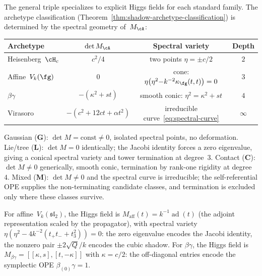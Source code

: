The general triple specializes to explicit Higgs fields for
each standard family. The archetype classification
(Theorem~\ref{thm:shadow-archetype-classification}) is
determined by the spectral geometry of~$M_\cA$:
\begin{center}
\small
\renewcommand{\arraystretch}{1.2}
\begin{tabular}{lccc}
\toprule
\textbf{Archetype}
 & $\det M_\cA$
 & \textbf{Spectral variety}
 & \textbf{Depth} \\
\midrule
Heisenberg~$\cH_c$
 & $c^2/4$
 & two points $\eta = \pm c/2$
 & $2$ \\[3pt]
Affine~$V_k(\fg)$
 & $0$
 & cone: $\eta\bigl(\eta^2 {-} k^{-2}
 \kappa_\fg(t,t)\bigr) = 0$
 & $3$ \\[3pt]
$\beta\gamma$
 & $-(\kappa^2 {+} st)$
 & smooth conic: $\eta^2 = \kappa^2 {+} st$
 & $4$ \\[3pt]
Virasoro
 & $-(c^2 {+} 12ct {+} \alpha t^2)$
 & irreducible curve~\eqref{eq:spectral-curve}
 & $\infty$ \\
\bottomrule
\end{tabular}
\end{center}
\noindent
Gaussian ($\mathbf{G}$): $\det M = \mathrm{const} \neq 0$,
isolated spectral points, no deformation.
Lie/tree ($\mathbf{L}$): $\det M = 0$ identically; the Jacobi
identity forces a zero eigenvalue, giving a conical spectral
variety and tower termination at degree~$3$.
Contact ($\mathbf{C}$): $\det M \neq 0$ generically, smooth
conic, termination by rank-one rigidity at degree~$4$.
Mixed ($\mathbf{M}$): $\det M \neq 0$ and the spectral curve is
irreducible; the self-referential OPE supplies the non-terminating
candidate classes, and termination is excluded only where these classes
survive.

For affine~$V_k(\mathfrak{sl}_2)$, the Higgs field is
$M_{\mathrm{aff}}(t) = k^{-1}\operatorname{ad}(t)$
(the adjoint representation scaled by the propagator), with
spectral variety
$\eta(\eta^2 - 4k^{-2}(t_+t_- + t_3^2)) = 0$:
the zero eigenvalue encodes the Jacobi identity,
the nonzero pair $\pm 2\sqrt{Q}/k$ encodes the cubic shadow.
For $\beta\gamma$, the Higgs field is
$M_{\beta\gamma} = [[\kappa, s],[t, -\kappa]]$
with $\kappa = c/2$: the off-diagonal entries encode the
symplectic OPE $\beta_{(0)}\gamma = 1$.

